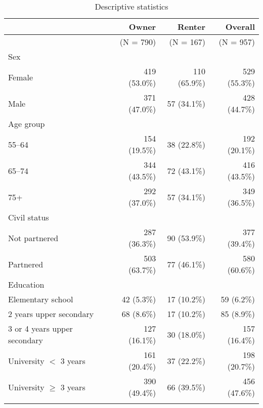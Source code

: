 \begin{table}[H]
\centering
\footnotesize
\begin{threeparttable}
\caption{\label{tab:desc}Descriptive statistics}
\begin{tabular}[t]{lrrr}
\toprule
 & Owner & Renter & Overall \\
\midrule
 & (N = 790) & (N = 167) & (N = 957) \\
\addlinespace[0.8em]

Sex & & & \\
\hspace{1em}Female & 419 (53.0\%) & 110 (65.9\%) & 529 (55.3\%) \\
\hspace{1em}Male & 371 (47.0\%) & 57 (34.1\%) & 428 (44.7\%) \\
\addlinespace[0.6em]

Age group & & & \\
\hspace{1em}55--64 & 154 (19.5\%) & 38 (22.8\%) & 192 (20.1\%) \\
\hspace{1em}65--74 & 344 (43.5\%) & 72 (43.1\%) & 416 (43.5\%) \\
\hspace{1em}75+ & 292 (37.0\%) & 57 (34.1\%) & 349 (36.5\%) \\
\addlinespace[0.6em]

Civil status & & & \\
\hspace{1em}Not partnered & 287 (36.3\%) & 90 (53.9\%) & 377 (39.4\%) \\
\hspace{1em}Partnered & 503 (63.7\%) & 77 (46.1\%) & 580 (60.6\%) \\
\addlinespace[0.6em]

Education & & & \\
\hspace{1em}Elementary school & 42 (5.3\%) & 17 (10.2\%) & 59 (6.2\%) \\
\hspace{1em}2 years upper secondary & 68 (8.6\%) & 17 (10.2\%) & 85 (8.9\%) \\
\hspace{1em}3 or 4 years upper secondary & 127 (16.1\%) & 30 (18.0\%) & 157 (16.4\%) \\
\hspace{1em}University $<$ 3 years & 161 (20.4\%) & 37 (22.2\%) & 198 (20.7\%) \\
\hspace{1em}University $\geq$ 3 years & 390 (49.4\%) & 66 (39.5\%) & 456 (47.6\%) \\
\addlinespace[0.6em]


\end{tabular}
\end{threeparttable}
\end{table}
